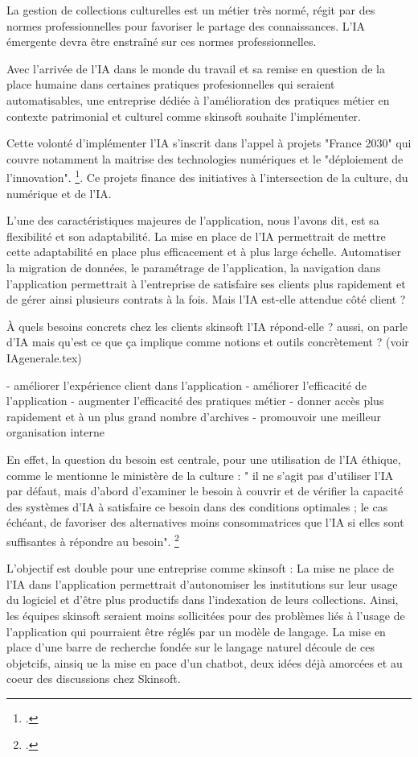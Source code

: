 \begin{itemize}
La gestion de collections culturelles est un métier très normé, régit par des normes professionnelles pour favoriser le partage des connaissances. L'IA émergente devra être enstraîné sur ces normes professionnelles. 

Avec l'arrivée de l'IA dans le monde du travail et sa remise en question de la place humaine dans certaines pratiques profesionnelles qui seraient automatisables, une entreprise dédiée à l'amélioration des pratiques métier en contexte patrimonial et culturel comme skinsoft souhaite l'implémenter. 

Cette volonté d'implémenter l'IA s'inscrit dans l'appel à projets "France 2030" qui couvre notamment la maitrise des technologies numériques et le "déploiement de l'innovation". \footcite{zotero-item-636}. Ce projets finance des initiatives à l'intersection de la culture, du numérique et de l'IA.

L'une des caractéristiques majeures de l'application, nous l'avons dit, est sa flexibilité et son adaptabilité. La mise en place de l'IA permettrait de mettre cette adaptabilité en place plus efficacement et à plus large échelle. Automatiser la migration de données, le paramétrage de l'application, la navigation dans l'application permettrait à l'entreprise de satisfaire ses clients plus rapidement et de gérer ainsi plusieurs contrats à la fois. Mais l'IA est-elle attendue côté client ? 

À quels besoins concrets chez les clients skinsoft l'IA répond-elle ?
aussi, on parle d'IA mais qu'est ce que ça implique comme notions et outils concrètement ? (voir IAgenerale.tex)

- améliorer l'expérience client dans l'application
- améliorer l'efficacité de l'application
- augmenter l'efficacité des pratiques métier 
- donner accès plus rapidement et à un plus grand nombre d'archives 
- promouvoir une meilleur organisation interne

En effet, la question du besoin est centrale, pour une utilisation de l'IA éthique, comme le mentionne le ministère de la culture : " il ne s’agit pas d’utiliser l’IA par défaut, mais d’abord d’examiner le besoin à couvrir et de vérifier la capacité des systèmes d’IA à satisfaire ce besoin dans des conditions optimales ; le cas échéant, de favoriser des alternatives moins consommatrices que l’IA si elles sont suffisantes à répondre au besoin". \footcite{2025a}

L'objectif est double pour une entreprise comme skinsoft : 
La mise ne place de l'IA dans l'application permettrait d'autonomiser les institutions sur leur usage du logiciel et d'être plus productifs dans l'indexation de leurs collections. 
Ainsi, les équipes skinsoft seraient moins sollicitées pour des problèmes liés à l'usage de l'application qui pourraient être réglés par un modèle de langage. 
La mise en place d'une barre de recherche fondée sur le langage naturel découle de ces objetcifs, ainsiq ue la mise en pace d'un chatbot, deux idées déjà amorcées et au coeur des discussions chez Skinsoft.


\end{itemize}
